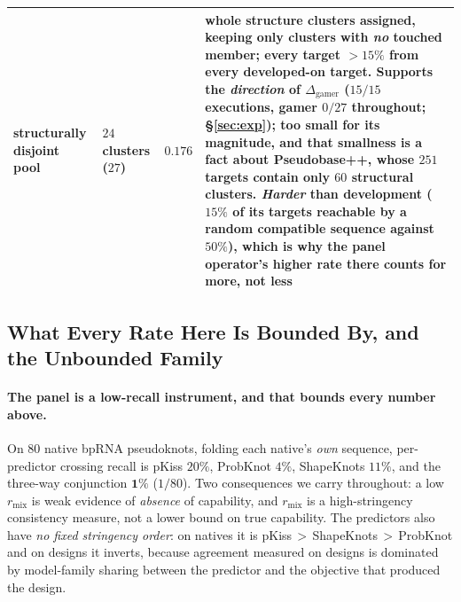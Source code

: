 \documentclass[11pt]{article}
\begin{document}
\begin{table}[t]
\begin{tabularx}{\linewidth}{@{}>{\raggedright\arraybackslash}p{2.7cm}>{\raggedright\arraybackslash}p{1.3cm}>{\centering\arraybackslash}p{1.15cm}L@{}}
\midrule
\textbf{structurally disjoint pool} & $24$ clusters ($27$) & $\mathbf{0.176}$ & whole structure clusters
assigned, keeping only
clusters with \emph{no} touched member; every target $>15\%$ from every developed-on target. Supports the
\emph{direction} of $\Delta_{\mathrm{gamer}}$ ($15/15$ executions, gamer $0/27$ throughout;
\S\ref{sec:exp}); too small for its magnitude, and that smallness is a fact about Pseudobase++, whose
$251$ targets contain only $60$ structural clusters. \emph{Harder} than development ($15\%$ of its targets
reachable by a random compatible sequence against $50\%$), which is why the panel operator's higher rate there
counts for more, not less\\
\bottomrule
\end{tabularx}
\end{table}


\subsection{What Every Rate Here Is Bounded By, and the Unbounded Family}\label{sec:exp:stats}
\paragraph{The panel is a low-recall instrument, and that bounds every number above.} On $80$ native bpRNA
pseudoknots, folding each native's \emph{own} sequence, per-predictor crossing recall is pKiss $20\%$, ProbKnot
$4\%$, ShapeKnots $11\%$, and the three-way conjunction $\mathbf{1\%}$ ($1/80$). Two consequences we carry
throughout: a low $r_{\mathrm{mix}}$ is weak evidence of \emph{absence} of capability, and $r_{\mathrm{mix}}$
is a high-stringency consistency measure, not a lower bound on true capability. The predictors also have
\emph{no fixed stringency order}: on natives it is pKiss\,$>$\,ShapeKnots\,$>$\,ProbKnot and on designs it
inverts, because agreement measured on designs is dominated by model-family sharing between the predictor and
the objective that produced the design.
\end{document}

